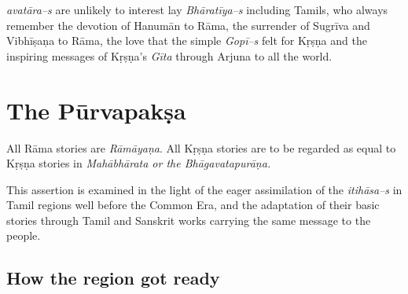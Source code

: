 \textit{avatāra–s} are unlikely to interest lay \textit{Bhāratīya–s} including Tamils, who always remember the devotion of Hanumān to Rāma, the surrender of Sugrīva and Vibhīṣaņa to Rāma, the love that the simple \textit{Gopī–s} felt for Kṛṣṇa and the inspiring messages of Kṛṣṇa’s \textit{Gīta} through Arjuna to all the world.


\section*{The Pūrvapakṣa}

All Rāma stories are \textit{Rāmāyaṇa}. All Kṛṣṇa stories are to be regarded as equal to Kṛṣṇa stories in \textit{Mahābhārata or the Bhāgavatapurāṇa.}

This assertion is examined in the light of the eager assimilation of the \textit{itihāsa–s} in Tamil regions well before the Common Era, and the adaptation of their basic stories through Tamil and Sanskrit works carrying the same message to the people.

\subsection*{How the region got ready}

